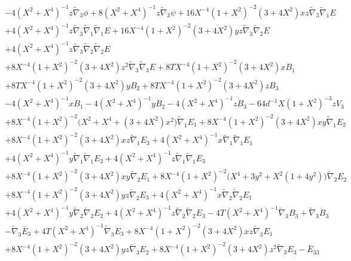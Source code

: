 \documentclass[10pt,letterpaper]{article}
\numberwithin{equation}{section}
\begin{document}
\begin{appendices}
\begin{eqnarray}
&& - 4 (X^2 + X^4)^{-1} z \tilde{\nabla}_{3}\phi + 8 (X^2 + X^4)^{-1} z \tilde{\nabla}_{3}\psi + 16 X^{-4} (1 + X^2)^{-2} (3 + 4 X^2) x z \tilde{\nabla}_{3}\tilde{\nabla}_{1}E \nonumber \\ 
&& + 4 (X^2 + X^4)^{-1} z \tilde{\nabla}_{3}\tilde{\nabla}_{1}\tilde{\nabla}_{1}E + 16 X^{-4} (1 + X^2)^{-2} (3 + 4 X^2) y z \tilde{\nabla}_{3}\tilde{\nabla}_{2}E \nonumber \\ 
&& + 4 (X^2 + X^4)^{-1} z \tilde{\nabla}_{3}\tilde{\nabla}_{2}\tilde{\nabla}_{2}E \nonumber \\ 
&& + 8 X^{-4} (1 + X^2)^{-2} (3 + 4 X^2) z^2 \tilde{\nabla}_{3}\tilde{\nabla}_{3}E+8 T X^{-4} (1 + X^2)^{-2} (3 + 4 X^2) x B_{1} \nonumber \\ 
&& + 8 T X^{-4} (1 + X^2)^{-2} (3 + 4 X^2) y B_{2} + 8 T X^{-4} (1 + X^2)^{-2} (3 + 4 X^2) z B_{3} \nonumber \\ 
&& - 4 (X^2 + X^4)^{-1} x \dot{B}_{1} - 4 (X^2 + X^4)^{-1} y \dot{B}_{2} - 4 (X^2 + X^4)^{-1} z \dot{B}_{3} - 64 d^{-1} X (1 + X^2)^{-3} z V_{3} \nonumber \\ 
&& + 8 X^{-4} (1 + X^2)^{-2} \bigl(X^2 + X^4 + (3 + 4 X^2) x^2\bigr) \tilde{\nabla}_{1}E_{1} + 8 X^{-4} (1 + X^2)^{-2} (3 + 4 X^2) x y \tilde{\nabla}_{1}E_{2} \nonumber \\ 
&& + 8 X^{-4} (1 + X^2)^{-2} (3 + 4 X^2) x z \tilde{\nabla}_{1}E_{3} + 4 (X^2 + X^4)^{-1} x \tilde{\nabla}_{1}\tilde{\nabla}_{1}E_{1} \nonumber \\ 
&& + 4 (X^2 + X^4)^{-1} y \tilde{\nabla}_{1}\tilde{\nabla}_{1}E_{2} + 4 (X^2 + X^4)^{-1} z \tilde{\nabla}_{1}\tilde{\nabla}_{1}E_{3} \nonumber \\ 
&& + 8 X^{-4} (1 + X^2)^{-2} (3 + 4 X^2) x y \tilde{\nabla}_{2}E_{1} + 8 X^{-4} (1 + X^2)^{-2} \bigl(X^4 + 3 y^2 + X^2 (1 + 4 y^2)\bigr) \tilde{\nabla}_{2}E_{2} \nonumber \\ 
&& + 8 X^{-4} (1 + X^2)^{-2} (3 + 4 X^2) y z \tilde{\nabla}_{2}E_{3} + 4 (X^2 + X^4)^{-1} x \tilde{\nabla}_{2}\tilde{\nabla}_{2}E_{1} \nonumber \\ 
&& + 4 (X^2 + X^4)^{-1} y \tilde{\nabla}_{2}\tilde{\nabla}_{2}E_{2} + 4 (X^2 + X^4)^{-1} z \tilde{\nabla}_{2}\tilde{\nabla}_{2}E_{3} - 4 T (X^2 + X^4)^{-1} \tilde{\nabla}_{3}B_{3} + \tilde{\nabla}_{3}\dot{B}_{3} \nonumber \\ 
&& -  \tilde{\nabla}_{3}\overset{..}{E}_{3} + 4 T (X^2 + X^4)^{-1} \tilde{\nabla}_{3}\dot{E}_{3} + 8 X^{-4} (1 + X^2)^{-2} (3 + 4 X^2) x z \tilde{\nabla}_{3}E_{1} \nonumber \\ 
&& + 8 X^{-4} (1 + X^2)^{-2} (3 + 4 X^2) y z \tilde{\nabla}_{3}E_{2} + 8 X^{-4} (1 + X^2)^{-2} (3 + 4 X^2) z^2 \tilde{\nabla}_{3}E_{3}- \overset{..}{E}_{33} \nonumber \\ 

\end{eqnarray}
\end{appendices}
\end{document}
